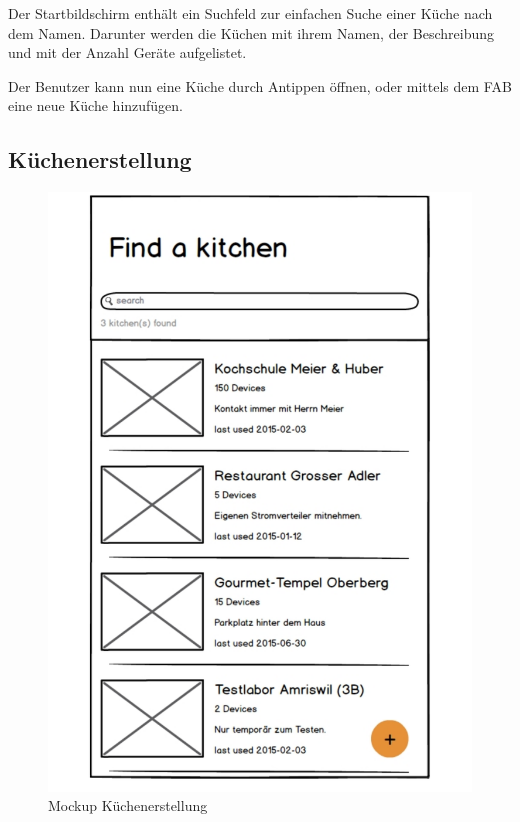Der Startbildschirm enthält ein Suchfeld zur einfachen Suche einer Küche nach dem Namen. Darunter werden die Küchen mit ihrem Namen, der Beschreibung und mit der Anzahl Geräte aufgelistet. 

Der Benutzer kann nun eine Küche durch Antippen öffnen, oder mittels dem \ac{FAB} eine neue Küche hinzufügen.

\WFclear
\vspace{3cm}

\subsection{Küchenerstellung}
\label{subsec:Küchenerstellung}

\begin{figure}
	\begin{center}
		\includegraphics[page=2,trim=0 0 0 0,clip,scale=0.21]{uiux/res/mockups}
		\caption{Mockup Küchenerstellung}
	    \label{abb:mockCreateKitchen}
	\end{center}
\end{figure}

